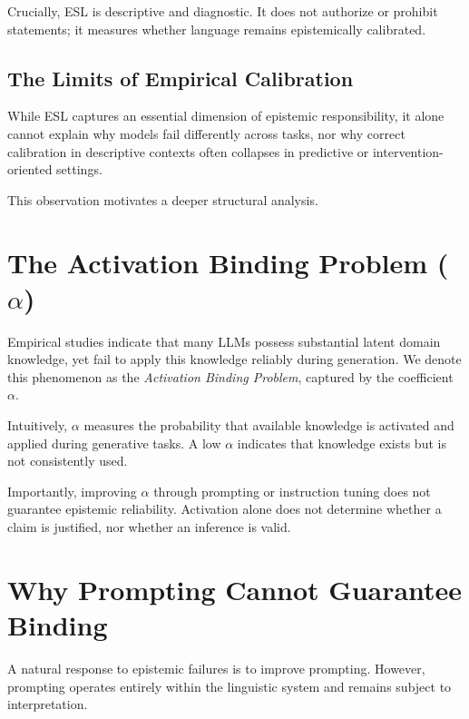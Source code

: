 \documentclass[11pt,a4paper]{article}
\begin{document}
Crucially, ESL is descriptive and diagnostic. It does not authorize or prohibit statements; it measures whether language remains epistemically calibrated.

\subsection{The Limits of Empirical Calibration}

While ESL captures an essential dimension of epistemic responsibility, it alone cannot explain why models fail differently across tasks, nor why correct calibration in descriptive contexts often collapses in predictive or intervention-oriented settings.

This observation motivates a deeper structural analysis.


\section{The Activation Binding Problem ($\alpha$)}

Empirical studies indicate that many LLMs possess substantial latent domain knowledge, yet fail to apply this knowledge reliably during generation. We denote this phenomenon as the \emph{Activation Binding Problem}, captured by the coefficient $\alpha$.

Intuitively, $\alpha$ measures the probability that available knowledge is activated and applied during generative tasks. A low $\alpha$ indicates that knowledge exists but is not consistently used.

Importantly, improving $\alpha$ through prompting or instruction tuning does not guarantee epistemic reliability. Activation alone does not determine whether a claim is justified, nor whether an inference is valid.


\section{Why Prompting Cannot Guarantee Binding}

A natural response to epistemic failures is to improve prompting. However, prompting operates entirely within the linguistic system and remains subject to interpretation.
\end{document}
